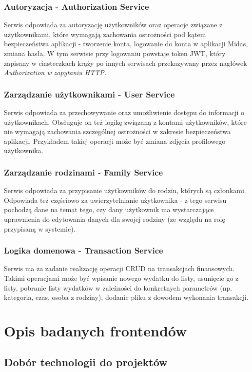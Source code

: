 \documentclass{SGGW-thesis}
\begin{document}
    \subsection{Autoryzacja - Authorization Service}
    Serwis odpowiada za autoryzację użytkowników oraz operacje związane z użytkownikami, które wymagają zachowania ostrożności pod kątem bezpieczeństwa aplikacji - tworzenie konta, logowanie do konta w aplikacji Midas, zmiana hasła. W tym serwisie przy logowaniu powstaje token JWT, który zapisany w ciasteczkach krąży po innych serwisach przekazywany przez nagłówek \it{Authorization} w zapytaniu HTTP. 

    \subsection{Zarządzanie użytkownikami - User Service}
    Serwis odpowiada za przechowywanie oraz umożliwienie dostępu do informacji o użytkownikach. Obsługuje on też logikę związaną z kontami użytkowników, które nie wymagają zachowania szczególnej ostrożności w zakresie bezpieczeństwa aplikacji. Przykładem takiej operacji może być zmiana zdjęcia profilowego użytkownika.

    \subsection{Zarządzanie rodzinami - Family Service}
    Serwis odpowiada za przypisanie użytkowników do rodzin, których są członkami. Odpowiada też częściowo za uwierzytelnianie użytkownika - z tego serwisu pochodzą dane na temat tego, czy dany użytkownik ma wystarczające uprawnienia do edytowania danych dla swojej rodziny (ze względu na rolę przypisaną w systemie).

    \subsection{Logika domenowa - Transaction Service}
    Serwis ma za zadanie realizację operacji CRUD na transakcjach finansowych. Takimi operacjami może być wpisanie nowego wydatku do listy, usunięcie go z listy, pobranie listy wydatków w zależności do konkretnych parametrów (np. kategoria, czas, osoba z rodziny), dodanie pliku z dowodem wykonania transakcji.

\chapter{Opis badanych frontendów}
  \section{Dobór technologii do projektów}
\end{document}
